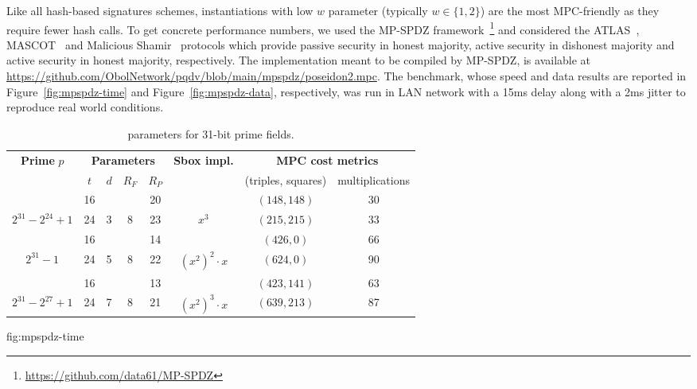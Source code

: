 Like all hash-based signatures schemes, instantiations with low $w$ parameter (typically $w \in \{1,2\}$) are the most MPC-friendly as they require fewer hash calls.
To get concrete performance numbers, we used the MP-SPDZ framework~\cite{mp-spdz}\footnote{\url{https://github.com/data61/MP-SPDZ}} and considered the ATLAS~\cite{atlas2021}, MASCOT~\cite{mascot2016} and Malicious Shamir~\cite{malshamir2017} protocols which provide passive security in honest majority, active security in dishonest majority and active security in honest majority, respectively.
The \PoseidonTwoPi implementation meant to be compiled by MP-SPDZ, is available at \url{https://github.com/ObolNetwork/pqdv/blob/main/mpspdz/poseidon2.mpc}.
The benchmark, whose speed and data results are reported in Figure~\ref{fig:mpspdz-time} and Figure~\ref{fig:mpspdz-data}, respectively, was run in LAN network with a 15ms delay along with a 2ms jitter to reproduce real world conditions.

\renewcommand\arraystretch{1.25}
\begin{table}[t]
	\centering
	\begin{tabular}{cccccccc}
		\toprule
    		\textbf{Prime} $p$ & \multicolumn{4}{c}{\textbf{Parameters}} & \textbf{Sbox impl.} & \multicolumn{2}{c}{\textbf{MPC cost metrics}}\\
    		 & {$t$} & {$d$} & {$R_F$} & {$R_P$} & & (triples, squares) & multiplications\\
    		\midrule
   
    		& 16 &  & & 20 &  & $(148, 148)$ & 30 \\
    		\multirow{-2}{*}{$2^{31}-2^{24}+1$} & 24 & \multirow{-2}{*}{3} & \multirow{-2}{*}{8} & 23 &  \multirow{-2}{*}{$x^3$} & $(215, 215)$ & 33\\
    		\midrule
    		& 16 &  &  & 14 & & $(426, 0)$ & 66 \\
    		\multirow{-2}{*}{$2^{31}-1$} & 24 & \multirow{-2}{*}{5} & \multirow{-2}{*}{8} & 22 &  \multirow{-2}{*}{$(x^2)^2 \cdot x$} & $(624, 0)$ & 90\\
    		\midrule
    		& 16 & & & 13 &  & $(423, 141)$ & 63\\
    		\multirow{-2}{*}{$2^{31}-2^{27} + 1$}  & 24  & \multirow{-2}{*}{7} & \multirow{-2}{*}{8} & 21 &  \multirow{-2}{*}{$(x^2)^3 \cdot x$ }  & $(639, 213)$  & 87\\
    		\bottomrule
	\end{tabular}fig:mpspdz-time
	\caption{\PoseidonTwoPi parameters for 31-bit prime fields.\label{tab:poseidon2_inst31}}
\end{table}

